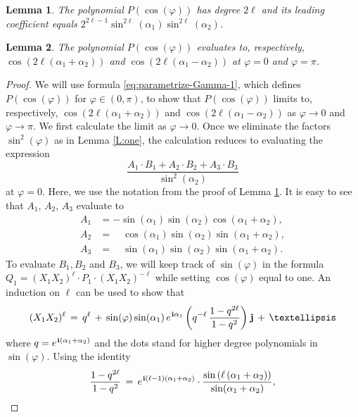 \documentclass[10pt,a4paper]{amsart}
\newtheorem{lemma}{Lemma}
\renewcommand{\i}{\mspace{1.5mu}\mathbf i}
\renewcommand{\j}{\mspace{1.5mu}\mathbf j}
\renewcommand{\phi}{\varphi}
\begin{document}
\begin{lemma}\label{L:two}
The polynomial $P(\cos(\phi))$ has degree $2\ell$ and its leading coefficient equals $2^{2\ell -1} \sin^{2\ell} (\alpha_1) \sin^{2\ell}(\alpha_2)$.
\end{lemma}

\begin{lemma}\label{L:four}
The polynomial $P(\cos(\phi))$ evaluates to, respectively, $\cos(2 \ell(\alpha_1 + \alpha_2))$ and $\cos(2\ell(\alpha_1 - \alpha_2))$ at $\phi = 0$ and $\phi = \pi$.
\end{lemma}

\begin{proof}
We will use formula \eqref{eq:parametrize-Gamma-1}, which defines $P(\cos(\phi))$ for $\phi \in (0,\pi)$, to show that $P(\cos(\phi))$ limits to, respectively, $\cos(2\ell(\alpha_1+\alpha_2))$ and $\cos(2\ell(\alpha_1-\alpha_2))$ as $\phi \to 0$ and $\phi \to \pi$. We first calculate the limit as $\phi \to 0$. Once we eliminate the factors $\sin^2(\phi)$ as in Lemma \ref{L:one}, the calculation reduces to evaluating the expression 
\[
\frac{A_1 \cdot B_1 + A_2 \cdot B_2 + A_3 \cdot B_3}{\sin^2(\alpha_2)}
\]
at $\phi = 0$. Here, we use the notation from the proof of Lemma \ref{L:two}. It is easy to see that $A_1$, $A_2$, $A_3$ evaluate to 
\[
\begin{aligned}
A_1 & = -  \sin(\alpha_1)\sin(\alpha_2)\cos(\alpha_1+\alpha_2), \\
A_2 & =  \quad \cos(\alpha_1)\sin(\alpha_2)\sin(\alpha_1+\alpha_2), \\
A_3 & =  \quad \sin(\alpha_1)\sin(\alpha_2)\sin(\alpha_1+\alpha_2).	
\end{aligned}
\]
To evaluate $B_1, B_2$ and $B_3$, we will keep track of $\sin(\phi)$ in the formula $Q_1 = (X_1X_2)^{\ell}\cdot P_1 \cdot (X_1X_2)^{-\ell}$ while setting $\cos(\phi)$ equal to one. An induction on $\ell$ can be used to show that
\begin{equation}\label{eq:X1X2_power}
(X_1X_2)^{\ell}\, =\, q^{\ell} \,+\, \sin(\phi)\sin(\alpha_1)\,e^{\i \alpha_1}\left(q^{-\ell}\, \frac{1 - q^{2\ell}}{1 - q^2}\right)\j\, +\, \dots
\end{equation}
where $q = e^{\i(\alpha_1+\alpha_2)}$ and the dots stand for higher degree polynomials in $\sin(\phi)$. Using
the identity
\[
\frac{1 - q^{2\ell}}{1 - q^2}\, =\, e^{\i(\ell-1)(\alpha_1+\alpha_2)}\cdot\frac{\sin\left(\ell\left(\alpha_1+\alpha_2\right)\right)}{\sin(\alpha_1+\alpha_2)},
\]


\end{proof}
\end{document}
